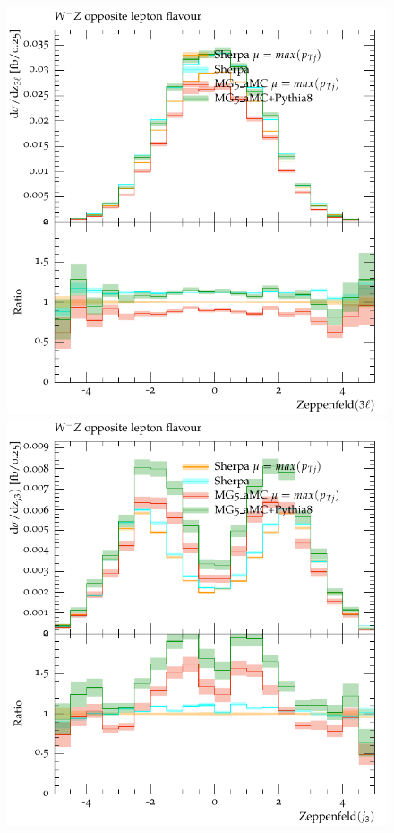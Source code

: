 \begin{figure}[htbp]
\begin{center}
   \includegraphics[scale=0.65]{figs/dyn_WmZ_OF_zep3l}
   \includegraphics[scale=0.65]{figs/dyn_WmZ_OF_zepj3}

\end{center}
\end{figure}
